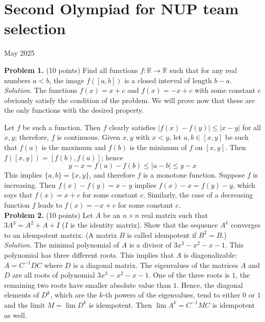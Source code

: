 \documentclass{article}
\begin{document}
\pagestyle{plain}

\section*{Second Olympiad for NUP team selection}

\begin{center}
May 2025
\end{center}

\textbf{Problem 1.} (10 points)
Find all functions $f : \mathbb{R} \to \mathbb{R}$ such that for any real numbers $a < b$, the image $f([a,b])$ is a closed interval of length $b - a$. \\

\textit{Solution.} The functions $f(x) = x + c$ and $f(x) = -x + c$ with some constant $c$ obviously satisfy the condition of the problem. We will prove now that these are the only functions with the desired property.

Let $f$ be such a function. Then $f$ clearly satisfies $|f(x) - f(y)| \leq |x - y|$ for all $x, y$; therefore, $f$ is continuous. Given $x, y$ with $x < y$, let $a, b \in [x, y]$ be such that $f(a)$ is the maximum and $f(b)$ is the minimum of $f$ on $[x, y]$. Then $f([x, y]) = [f(b), f(a)]$; hence
\[
y - x = f(a) - f(b) \leq |a - b| \leq y - x
\]
This implies $\{a, b\} = \{x, y\}$, and therefore $f$ is a monotone function. Suppose $f$ is increasing. Then $f(x) - f(y) = x - y$ implies $f(x) - x = f(y) - y$, which says that $f(x) = x + c$ for some constant $c$. Similarly, the case of a decreasing function $f$ leads to $f(x) = -x + c$ for some constant $c$.\\

\textbf{Problem 2.} (10 points)
Let $A$ be an $n \times n$ real matrix such that $3A^3 = A^2 + A + I$ ($I$ is the identity matrix). Show that the sequence $A^k$ converges to an idempotent matrix. (A matrix $B$ is called idempotent if $B^2 = B$.) \\

\textit{Solution.} The minimal polynomial of $A$ is a divisor of $3x^3 - x^2 - x - 1$.
This polynomial has three different roots.
This implies that $A$ is diagonalizable: $A = C^{-1}DC$ where $D$ is a diagonal matrix.
The eigenvalues of the matrices $A$ and $D$ are all roots of polynomial $3x^3 - x^2 - x - 1$.
One of the three roots is $1$, the remaining two roots have smaller absolute value than $1$.
Hence, the diagonal elements of $D^k$, which are the $k$-th powers of the eigenvalues, tend to either $0$ or $1$ and the limit $M = \lim D^k$ is idempotent. Then $\lim A^k = C^{-1}MC$ is idempotent as well.\\
\end{document}
